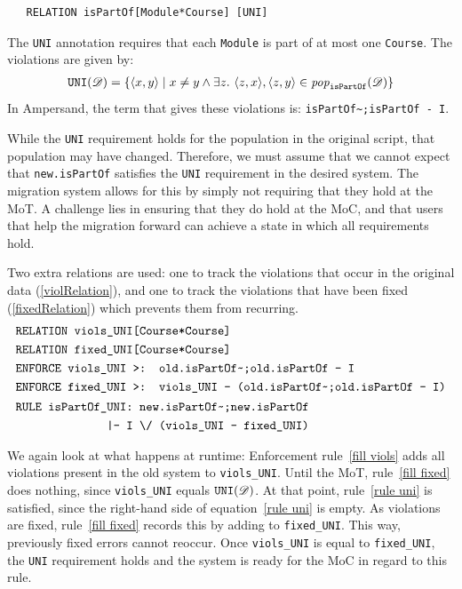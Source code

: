 \documentclass[runningheads]{llncs}
\newcommand{\id}[1]{\text{\it #1\/}}
\newcommand{\popF}[1]{\id{pop}_{#1}}
\newcommand{\pop}[2]{\popF{#1}(#2)}
\newcommand{\viol}[2]{{#1}(#2)}
\newcommand{\pair}[2]{\langle{#1},{#2}\rangle}
\newcommand{\dataset}{\mathscr{D}}
\begin{document}
\begin{verbatim}
   RELATION isPartOf[Module*Course] [UNI]
\end{verbatim}
   
   The \verb=UNI= annotation requires that each \verb=Module= is part of at most one \verb=Course=.
   The violations are given by:
\begin{eqnarray}
   \viol{\tt UNI}{\dataset} = \{\pair{x}{y} \mid x \neq y \wedge \exists z.~ \pair{z}{x}, \pair{z}{y}\in\pop{\tt isPartOf}{\dataset} \}
\end{eqnarray}
   In Ampersand, the term that gives these violations is: \verb=isPartOf~;isPartOf - I=.
   
   While the \verb=UNI= requirement holds for the population in the original script, that population may have changed.
   Therefore, we must assume that we cannot expect that \verb=new.isPartOf= satisfies the \verb=UNI= requirement in the desired system.
   The migration system allows for this by simply not requiring that they hold at the MoT.
   A challenge lies in ensuring that they do hold at the MoC, and that users that help the migration forward can achieve a state in which all requirements hold.
   
   Two extra relations are used: one to track the violations that occur in the original data (\ref{violRelation}), and one to track the violations that have been fixed (\ref{fixedRelation}) which prevents them from recurring.
\begin{align}
   &\text{\tt RELATION viols\_UNI[Course*Course]}\label{violRelation}\\
   &\text{\tt RELATION fixed\_UNI[Course*Course]}\label{fixedRelation}\\
   &\text{\tt ENFORCE viols\_UNI >: old.isPartOf\textasciitilde;old.isPartOf - I}\label{fill viols}\\
   &\text{\tt ENFORCE fixed\_UNI >: viols\_UNI - (old.isPartOf\textasciitilde;old.isPartOf - I)}\label{fill fixed}\\
   &\begin{aligned}
   \text{\tt RULE isPartOf\_UNI: new.isPartOf\textasciitilde;new.isPartOf}\\
   \quad\text{\tt |- I \textbackslash/ (viols\_UNI - fixed\_UNI)}
   \end{aligned}\label{rule uni}
\end{align}
   
   We again look at what happens at runtime:
   Enforcement rule~\ref{fill viols} adds all violations present in the old system to {\tt viols\_UNI}.
   Until the MoT, rule~\ref{fill fixed} does nothing, since {\tt viols\_UNI} equals $\viol{\tt UNI}{\dataset}$.
   At that point, rule~\ref{rule uni} is satisfied, since the right-hand side of equation~\ref{rule uni} is empty.
   As violations are fixed, rule~\ref{fill fixed} records this by adding to {\tt fixed\_UNI}.
   This way, previously fixed errors cannot reoccur.
   Once {\tt viols\_UNI} is equal to {\tt fixed\_UNI}, the \verb=UNI= requirement holds and the system is ready for the MoC in regard to this rule.
   
\end{document}
